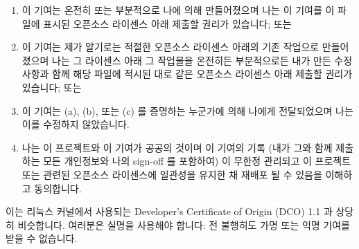 \begin{enumerate}[label={(\alph*)}]
\item	이 기여는 온전히 또는 부분적으로 나에 의해 만들어졌으며 나는 이 기여를
	이 파일에 표시된 오픈소스 라이센스 아래 제출할 권리가 있습니다; 또는
\item	이 기여는 제가 알기로는 적절한 오픈소스 라이센스 아래의 기존 작업으로
	만들어졌으며 나는 그 라이센스 아래 그 작업물을 온전히든 부분적으로든
	내가 만든 수정사항과 함께 해당 파일에 적시된 대로 같은 오픈소스
	라이센스 아래 제출할 권리가 있습니다; 또는
\item	이 기여는 (a), (b), 또는 (c) 를 증명하는 누군가에 의해 나에게
	전달되었으며 나는 이를 수정하지 않았습니다.
\item	나는 이 프로젝트와 이 기여가 공공의 것이며 이 기여의 기록 (내가 그와
	함께 제출하는 모든 개인정보와 나의 sign-off 를 포함하여) 이 무한정
	관리되고 이 프로젝트 또는 관련된 오픈소스 라이센스에 일관성을 유지한 채
	재배포 될 수 있음을 이해하고 동의합니다.

\iffalse

\item	The contribution was created in whole or in part
	by me and I have the right to submit it under
	the open source license indicated in the file; or
\item	The contribution is based upon previous work
	that, to the best of my knowledge, is covered
	under an appropriate open source license and I
	have the right under that license to submit that
	work with modifications, whether created in whole
	or in part by me, under the same open source
	license (unless I am permitted to submit under
	a different license), as indicated in the file; or
\item	The contribution was provided directly to me by
	some other person who certified (a), (b) or (c)
	and I have not modified it.
\item	I understand and agree that this project and the
	contribution are public and that a record of the
	contribution (including all personal information
	I submit with it, including my sign-off) is
	maintained indefinitely and may be redistributed
	consistent with this project or the open source
	license(s) involved.

\fi

\end{enumerate}

이는 리눅스 커널에서 사용되는 Developer's Certificate of Origin (DCO) 1.1 과
상당히 비슷합니다.
여러분은 실명을 사용해야 합니다:  전 불행히도 가명 또는 익명 기여를 받을 수
없습니다.

